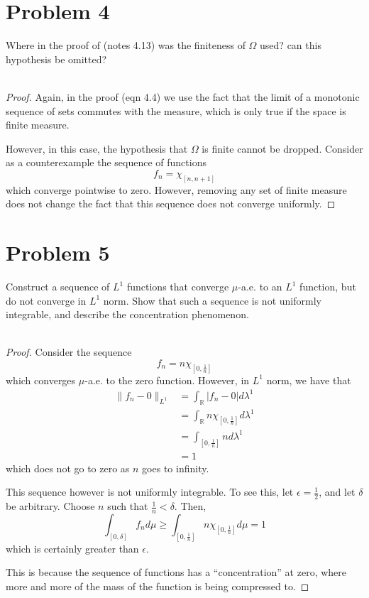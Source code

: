 \documentclass[fontsize=11pt]{scrartcl} %
\numberwithin{equation}{section} %
\numberwithin{figure}{section} %
\numberwithin{table}{section} %
\newcommand{\R}{\mathbb{R}}
\begin{document}
\section*{Problem 4}
Where in the proof of (notes 4.13) was the finiteness of $\Omega$ used? can this
hypothesis be omitted?
\\
\\
\begin{proof}
    Again, in the proof (eqn 4.4) we use the fact that the limit of a monotonic
    sequence of sets commutes with the measure, which is only true if the space
    is finite measure.

    However, in this case, the hypothesis that $\Omega$ is finite cannot be
    dropped. Consider as a counterexample the sequence of functions
    \[
        f_n = \chi_{[n,n+1]}
    \]
    which converge pointwise to zero. However, removing any set of finite
    measure does not change the fact that this sequence does not converge
    uniformly. 
\end{proof}

\section*{Problem 5}
Construct a sequence of $L^1$ functions that converge $\mu$-a.e. to an $L^1$
function, but do not converge in $L^1$ norm. Show that such a sequence is not
uniformly integrable, and describe the concentration phenomenon.
\\
\\
\begin{proof}
    Consider the sequence
    \[
        f_n = n\chi_{[0,\frac{1}{n}]}
    \]
    which converges $\mu$-a.e. to the zero function. However, in $L^1$ norm, we
    have that
    \[
        \begin{aligned}
            \|f_n-0\|_{L^1} &= \int_{\R}|f_n-0|d\lambda^1\\
                            &= \int_{\R}n\chi_{[0,\frac{1}{n}]}d\lambda^1\\
                            &= \int_{[0,\frac{1}{n}]}nd\lambda^1\\
                            &=1
        \end{aligned}
    \]
    which does not go to zero as $n$ goes to infinity.

    This sequence however is not uniformly integrable. To see this, let
    $\epsilon=\frac{1}{2}$, and let $\delta$ be arbitrary. Choose $n$ such that
    $\frac{1}{n}<\delta$. Then,
    \[
        \int_{[0,\delta]}f_nd\mu \geq
        \int_{[0,\frac{1}{n}]}n\chi_{[0,\frac{1}{n}]}d\mu = 1
    \]
    which is certainly greater than $\epsilon$.

    This is because the sequence of functions has a ``concentration'' at zero,
    where more and more of the mass of the function is being compressed to.
\end{proof}
\end{document}
